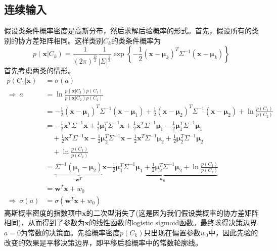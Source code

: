 \subsection*{连续输入}
假设类条件概率密度是高斯分布，然后求解后验概率的形式。首先，假设所有的类别的协方差矩阵相同。这样类别$C_k$的类条件概率为
\begin{equation}
	p(\boldsymbol{x}|C_k)=\frac{1}{(2\pi)^{\frac{D}{2}}}\frac{1}{|\Sigma|^{\frac{1}{2}}}\exp\left\{-\frac{1}{2}(\boldsymbol{x}-\boldsymbol{\mu}_k)^T\Sigma^{-1}(\boldsymbol{x}-\boldsymbol{\mu}_k) \right\}
\end{equation}
首先考虑两类的情形。
\begin{equation}
\begin{aligned}
	p(C_1|\boldsymbol{x})&=\sigma(a)\\
	\Rightarrow\ a&=\ln \frac{p(\boldsymbol{x}|C_1)p(C_1)}{p(\boldsymbol{x}|C_2)p(C_2)}\\
	&=-\frac{1}{2}(\boldsymbol{x}-\boldsymbol{\mu}_1)^T\Sigma^{-1}(\boldsymbol{x}-\boldsymbol{\mu}_1)+\frac{1}{2}(\boldsymbol{x}-\boldsymbol{\mu}_2)^T\Sigma^{-1}(\boldsymbol{x}-\boldsymbol{\mu}_2)+\ln\frac{p(C_1)}{p(C_2)} \\
	&=-\frac{1}{2}\boldsymbol{x}^T\Sigma^{-1}\boldsymbol{x}+\frac{1}{2}\boldsymbol{\mu}_1^T\Sigma^{-1}\boldsymbol{x}+\frac{1}{2}\boldsymbol{x}^T\Sigma^{-1}\boldsymbol{\mu}_1-\frac{1}{2}\boldsymbol{\mu}_1^T\Sigma^{-1}\boldsymbol{\mu}_1\\
	&\quad +\frac{1}{2}\boldsymbol{x}^T\Sigma^{-1}\boldsymbol{x}-\frac{1}{2}\boldsymbol{\mu}_2^T\Sigma^{-1}\boldsymbol{x}-\frac{1}{2}\boldsymbol{x}^T\Sigma^{-1}\boldsymbol{\mu}_2+\frac{1}{2}\boldsymbol{\mu}_2^T\Sigma^{-1}\boldsymbol{\mu}_2\\
	&\quad +\ln\frac{p(C_1)}{p(C_2)}\\
	&=\underbrace{\Sigma^{-1}(\boldsymbol{\mu}_1-\boldsymbol{\mu}_2)}_{\boldsymbol{w}^T}\boldsymbol{x} \underbrace{- \frac{1}{2}\boldsymbol{\mu}_1^T\Sigma^{-1}\boldsymbol{\mu}_1+\frac{1}{2}\boldsymbol{\mu}_2^T\Sigma^{-1}\boldsymbol{\mu}_2+\ln\frac{p(C_1)}{p(C_2)}}_{w_0}\\
	&=\boldsymbol{w}^T\boldsymbol{x}+w_0\\
	\Rightarrow \ \sigma(a)&=\sigma(\boldsymbol{w}^T\boldsymbol{x}+w_0)
\end{aligned}	
\end{equation}
高斯概率密度的指数项中$\boldsymbol{x}$的二次型消失了(这是因为我们假设类概率的协方差矩阵相同)，从而得到了参数为$\boldsymbol{x}$的线性函数的logistic sigmoid函数。最终求得决策边界$a=0$为常数的决策面。先验概率密度$p(C_k)$只出现在偏置参数$w_0$中，因此先验的改变的效果是平移决策边界，即平移后验概率中的常数轮廓线。

